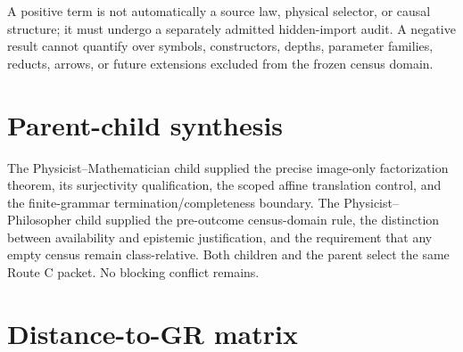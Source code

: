 \documentclass[11pt]{article}
\begin{document}
A positive term is not automatically a source law, physical selector, or
causal structure; it must undergo a separately admitted hidden-import audit.
A negative result cannot quantify over symbols, constructors, depths, parameter
families, reducts, arrows, or future extensions excluded from the frozen
census domain.

\section{Parent-child synthesis}

The Physicist--Mathematician child supplied the precise image-only
factorization theorem, its surjectivity qualification, the scoped affine
translation control, and the finite-grammar termination/completeness boundary.
The Physicist--Philosopher child supplied the pre-outcome census-domain rule,
the distinction between availability and epistemic justification, and the
requirement that any empty census remain class-relative.  Both children and
the parent select the same Route C packet.  No blocking conflict remains.

\section{Distance-to-GR matrix}
\end{document}
